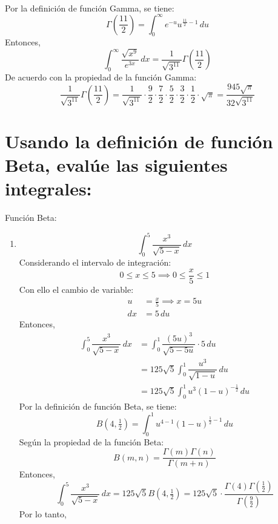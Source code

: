 \begin{multicols}{2}
\begin{enumerate}
\[\begin{aligned}
    \end{aligned}
  \]
  Por la definición de función Gamma, se tiene: 
  \[
    \Gamma\left(\frac{11}{2}\right) = \int_{0}^{\infty} e^{-u} u^{\frac{11}{2}-1} \,du
  \]
  Entonces,
  \[
    \int_{0}^{\infty} \dfrac{\sqrt{x^{9}}}{e^{3x}} \, dx = \frac{1}{\sqrt{3^{11}}} \Gamma\left(\frac{11}{2}\right)
  \]
  De acuerdo con la propiedad de la función Gamma:
  \[
    \frac{1}{\sqrt{3^{11}}} \Gamma\left(\frac{11}{2}\right) = \frac{1}{\sqrt{3^{11}}} \cdot \frac{9}{2} \cdot \frac{7}{2} \cdot \frac{5}{2} \cdot \frac{3}{2} \cdot \frac{1}{2} \cdot \sqrt{\pi} = \frac{945\sqrt{\pi}}{32\sqrt{3^{11}}}
  \]
\end{enumerate}
\section{Usando la definición de función Beta, evalúe las siguientes integrales:}
Función Beta:
\begin{center}
\end{center}
\begin{enumerate}
  \item \[
    \displaystyle \int_{0}^{5} \dfrac{x^{3}}{\sqrt{5-x}} \, dx
  \]
  Considerando el intervalo de integración:
  \[
    0 \leq x \leq 5 \implies 0 \leq \frac{x}{5} \leq 1
  \]
  Con ello el cambio de variable:
  \[
    \begin{aligned}
      u &= \frac{x}{5} \implies x = 5u \\
      dx &= 5 \, du
    \end{aligned}
  \]
  Entonces,
  \[
    \begin{aligned}
      \int_{0}^{5} \dfrac{x^{3}}{\sqrt{5-x}} \, dx &= \int_{0}^{1} \dfrac{(5u)^{3}}{\sqrt{5-5u}} \cdot 5 \, du \\
      &= 125 \sqrt{5} \int_{0}^{1} \dfrac{u^{3}}{\sqrt{1-u}} \, du \\
      &= 125 \sqrt{5} \int_{0}^{1} u^{3} (1-u)^{-\frac{1}{2}} \, du
    \end{aligned}
  \]
  Por la definición de función Beta, se tiene:
  \[
    B(4, \tfrac{1}{2}) = \int_{0}^{1} u^{4-1} (1-u)^{\frac{1}{2}-1} \, du
  \]
  Según la propiedad de la función Beta:
  \[
    B(m,n) = \frac{\Gamma(m)\Gamma(n)}{\Gamma(m+n)}
  \]
  Entonces,
  \[
    \int_{0}^{5} \dfrac{x^{3}}{\sqrt{5-x}} \, dx = 125 \sqrt{5} B(4, \tfrac{1}{2}) = 125 \sqrt{5} \cdot \frac{\Gamma(4)\Gamma(\tfrac{1}{2})}{\Gamma(\tfrac{9}{2})}
  \]
  Por lo tanto,
  \[
\]
\end{enumerate}
\end{multicols}
